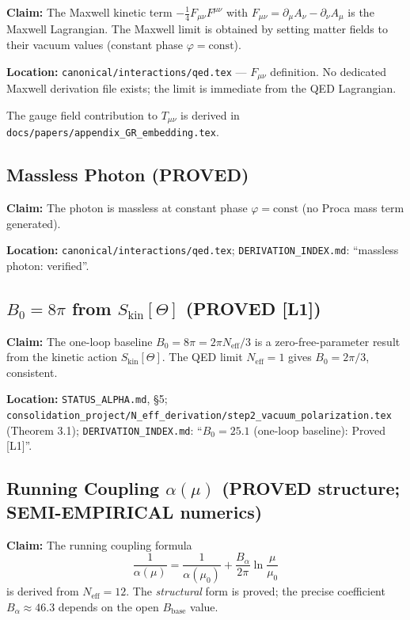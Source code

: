 \documentclass[11pt,a4paper]{article}
\begin{document}
\textbf{Claim:} The Maxwell kinetic term $-\tfrac{1}{4}F_{\mu\nu}F^{\mu\nu}$ with
$F_{\mu\nu} = \partial_\mu A_\nu - \partial_\nu A_\mu$ is the Maxwell Lagrangian.
The Maxwell limit is obtained by setting matter fields to their vacuum values
(constant phase $\varphi = \mathrm{const}$).

\textbf{Location:} \texttt{canonical/interactions/qed.tex} — $F_{\mu\nu}$ definition.
No dedicated Maxwell derivation file exists; the limit is immediate from the
QED Lagrangian.

The gauge field contribution to $T_{\mu\nu}$ is derived in
\texttt{docs/papers/appendix\_GR\_embedding.tex}.

\subsection{Massless Photon (PROVED)}

\textbf{Claim:} The photon is massless at constant phase $\varphi = \mathrm{const}$
(no Proca mass term generated).

\textbf{Location:} \texttt{canonical/interactions/qed.tex};
\texttt{DERIVATION\_INDEX.md}: ``massless photon: verified''.

\subsection{\texorpdfstring{$B_0 = 8\pi$ from $S_\text{kin}[\Theta]$}{B0 = 8pi} (PROVED [L1])}

\textbf{Claim:} The one-loop baseline $B_0 = 8\pi = 2\pi N_\text{eff}/3$
is a zero-free-parameter result from the kinetic action $S_\text{kin}[\Theta]$.
The QED limit $N_\text{eff} = 1$ gives $B_0 = 2\pi/3$, consistent.

\textbf{Location:} \texttt{STATUS\_ALPHA.md}, §5;
\texttt{consolidation\_project/N\_eff\_derivation/step2\_vacuum\_polarization.tex}
(Theorem 3.1);
\texttt{DERIVATION\_INDEX.md}: ``$B_0 = 25.1$ (one-loop baseline): Proved [L1]''.

\subsection{Running Coupling \texorpdfstring{$\alpha(\mu)$}{alpha(mu)} (PROVED structure; SEMI-EMPIRICAL numerics)}

\textbf{Claim:} The running coupling formula
\[
\frac{1}{\alpha(\mu)} = \frac{1}{\alpha(\mu_0)} + \frac{B_\alpha}{2\pi}\ln\frac{\mu}{\mu_0}
\]
is derived from $N_\text{eff} = 12$. The \emph{structural} form is proved;
the precise coefficient $B_\alpha \approx 46.3$ depends on the open $B_\text{base}$ value.
\end{document}
